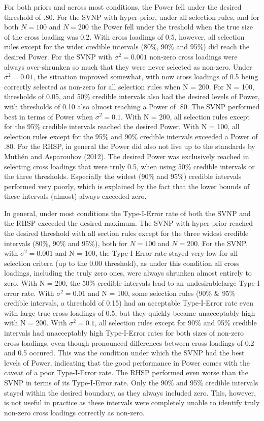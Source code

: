 \documentclass[
  man, donotrepeattitle,floatsintext]{apa6}
\begin{document}
For both priors and across most conditions, the Power fell under the
desired threshold of .80. For the SVNP with hyper-prior, under all selection rules, and for both \(N = 100\) and \(N = 200\) the Power fell under the treshold when the true size of the cross loading was 0.2. With cross loadings of 0.5, however, all selection rules except for the wider credible intervals (80\%, 90\% and 95\%) did reach the desired Power. For the SVNP with \(\sigma^2 = 0.001\) non-zero cross loadings were always over-shrunken so much that they were never selected as non-zero. Under \(\sigma^2 = 0.01\), the situation improved
somewhat, with now cross loadings of 0.5 being correctly selected as
non-zero for all selection rules when N = 200. For N = 100, thresholds
of 0.05, and 50\% credible intervals also had the desired levels of
Power, with thresholds of 0.10 also almost reaching a Power of .80. The
SVNP performed best in terms of Power when \(\sigma^2 = 0.1\). With N =
200, all selection rules except for the 95\% credible intervals reached
the desired Power. With N = 100, all selection rules except for the 95\%
and 90\% credible intervals exceeded a Power of .80. For the RHSP, in
general the Power did also not live up to the standards by
Muthén and Asparouhov (2012). The desired Power was exclusively reached in
selecting cross loadings that were truly 0.5, when using 50\% credible
intervals or the three thresholds. Especially the widest (90\% and 95\%)
credible intervals performed very poorly, which is explained by the fact
that the lower bounds of these intervals (almost) always exceeded zero.

In general, under most conditions the Type-I-Error rate of both the SVNP
and the RHSP exceeded the desired maximum. The SVNP with hyper-prior reached the desired threshold with all section rules except for the three widest credible intervals (80\%, 90\% and 95\%), both for \(N = 100\) and \(N = 200\). For the SVNP, with
\(\sigma^2 = 0.001\) and N = 100, the Type-I-Error rate stayed very low
for all selection critera (up to the 0.00 threshold), as under this
condition all cross loadings, including the truly zero ones, were always
shrunken almost entirely to zero. With N = 200, the 50\% credible
intervals lead to an undesirablelarge Type-I error rate. With
\(\sigma^2 = 0.01\) and N = 100, some selection rules (90\% \& 95\% credible
intervals, a threshold of 0.15) had an acceptable Type-I-Error rate even
with large true cross loadings of 0.5, but they quickly became
unacceptably high with N = 200. With \(\sigma^2 = 0.1\), all selection
rules except for 90\% and 95\% credible intervals had unacceptably high
Type-I-Error rates for both sizes of non-zero cross loadings, even
though pronounced differences between cross loadings of 0.2 and 0.5
occured. This was the condition under which the SVNP had the best levels
of Power, indicating that the good performance in Power comes with the
caveat of a poor Type-I-Error rate. The RHSP performed even worse than
the SVNP in terms of its Type-I-Error rate. Only the 90\% and 95\%
credible intervals stayed within the desired boundary, as they always
included zero. This, however, is not useful in practice as these
intervals were completely unable to identify truly non-zero cross
loadings correctly as non-zero.
\end{document}
